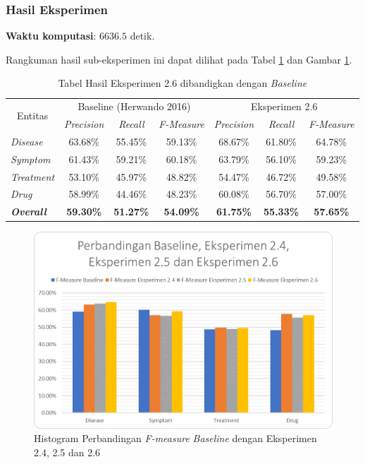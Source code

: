 	\subsubsection{Hasil Eksperimen}
	\textbf{Waktu komputasi}: $ 6636.5 $ detik.
	
	Rangkuman hasil sub-eksperimen ini dapat dilihat pada Tabel \ref{table:owndict6} dan Gambar \ref{fig:owndict6}.
	\begin{table}
		\centering
		\caption{Tabel Hasil Eksperimen 2.6 dibandigkan dengan \textit{Baseline}}
		\begin{tabular}{|l|c|c|c|c|c|c|}
			\hline
			\multicolumn{1}{|c|}{\multirow{2}{*}{Entitas}} & \multicolumn{3}{c|}{Baseline (Herwando 2016)} & \multicolumn{3}{c|}{Eksperimen 2.6} \\ \cline{2-7} 
			\multicolumn{1}{|c|}{} & \textit{Precision} & \textit{Recall} & \textit{F-Measure} & \textit{Precision} & \textit{Recall} & \textit{F-Measure} \\ \hline
			\textit{Disease} & 63.68\% & 55.45\% & 59.13\% & 68.67\% & 61.80\% & 64.78\% \\ \hline
			\textit{Symptom} & 61.43\% & 59.21\% & 60.18\% & 63.79\% & 56.10\% & 59.23\% \\ \hline
			\textit{Treatment} & 53.10\% & 45.97\% & 48.82\% & 54.47\% & 46.72\% & 49.58\% \\ \hline
			\textit{Drug} & 58.99\% & 44.46\% & 48.23\% & 60.08\% & 56.70\% & 57.00\% \\ \hline
			\textit{\textbf{Overall}} & \textbf{59.30\%} & \textbf{51.27\%} & \textbf{54.09\%} & \textbf{61.75\%} & \textbf{55.33\%} & \textbf{57.65\%} \\ \hline
		\end{tabular}
		\label{table:owndict6}
	\end{table}
	
	\begin{figure}
		\centering
		\includegraphics[width=0.85\linewidth]{images/histogram6}
		\caption{Histogram Perbandingan \textit{F-measure} \textit{Baseline} dengan Eksperimen 2.4, 2.5 dan 2.6}
		\label{fig:owndict6}
	\end{figure}
	
